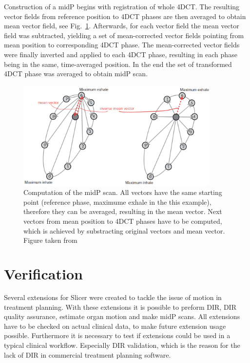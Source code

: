 \documentclass[type=dr, dr=rernat, accentcolor=tud7b,colorbacktitle, bigchapter, openright, twoside, 12pt ]{tudthesis}
\begin{document}
Construction of a midP begins with registration of whole 4DCT. The resulting vector fields from reference position to 4DCT phases are then averaged to obtain mean vector field, see Fig.~\ref{midPgeneration}. Afterwards, for each vector field the mean vector field was subtracted, yielding a set of mean-corrected vector fields pointing from mean position to corresponding 4DCT phase. The mean-corrected vector fields were finally inverted and applied to each 4DCT phase, resulting in each phase being in the same, time-averaged position. In the end the set of transformed 4DCT phase was averaged to obtain midP scan.

\begin{figure}[H]
\begin{center}
\includegraphics[width=0.9\textwidth]{./Images/midPgeneration.png}
\caption{Computation of the midP scan. All vectors have the same starting point (reference phase, maximume exhale in the this example), therefore they can be averaged, resulting in the mean vector.
	Next vectors from mean position to 4DCT phases have to be computed, which is achieved by substracting original vectors and mean vector. Figure taken from \cite{Wolthaus2008}}
\label{midPgeneration}
\end{center}
\end{figure}



\section{Verification}
\label{Verification}

Several extensions for Slicer were created to tackle the issue of motion in treatment planning. With these extensions it is possible to preform DIR, DIR quality assurance, estimate organ motion and make midP scans. All extensions have to be checked on actual clinical data, to make future extension usage possible. Furthermore it is necessary to test if extensions could be used in a typical clinical workflow. Especially DIR validation, which is the reason for the lack of DIR in commercial treatment planning software. 
\end{document}
